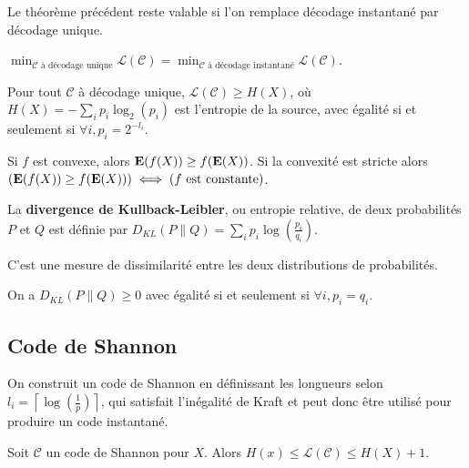 \begin{thm}
	Le théorème précédent reste valable si l'on remplace décodage instantané par décodage unique.
\end{thm}

\begin{cor}
	$\min_{\mathcal{C} \text{ à décodage unique}} \mathcal{L}(\mathcal{C}) = \min_{\mathcal{C} \text{ à décodage instantané}} \mathcal{L}(\mathcal{C})$.
\end{cor}

\begin{thm}
	Pour tout $\mathcal{C}$ à décodage unique, $\mathcal{L}(\mathcal{C}) \geq H(X)$, où $H(X) = - \sum_i p_i \log_2(p_i)$ est l'entropie de la source, avec égalité si et seulement si $\forall i, p_i = 2^{-l_i}$.
\end{thm}

\begin{thm}
	Si $f$ est convexe, alors $\mathbf{E}(f(X)) \geq f(\mathbf{E}(X))$.
	Si la convexité est stricte alors\\
	$\left( \mathbf{E}(f(X)) \geq f(\mathbf{E}(X)) \right) \iff \left( f \text{ est constante}\right)$.
\end{thm}

\begin{defn}
	La \textbf{divergence de Kullback-Leibler}, ou entropie relative, de deux probabilités $P$ et $Q$ est définie par $D_{KL}(P \| Q) = \sum_i p_i \log \left( \frac{p_i}{q_i} \right)$.
\end{defn}

C'est une mesure de dissimilarité entre les deux distributions de probabilités.

\begin{cor}
	On a $D_{KL}(P \| Q) \geq 0$ avec égalité si et seulement si $\forall i, p_i = q_i$.
\end{cor}

\subsection{Code de Shannon}

	On construit un code de Shannon en définissant les longueurs selon $l_i = \left\lceil \log \left( \frac{1}{p} \right) \right\rceil$, qui satisfait l'inégalité de Kraft et peut donc être utilisé pour produire un code instantané.
	
	\begin{pop}
		Soit $\mathcal{C}$ un code de Shannon pour $X$. Alors $H(x) \leq \mathcal{L}(\mathcal{C}) \leq  H(X) + 1$.
	\end{pop}

